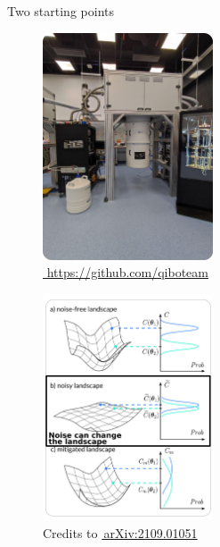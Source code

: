 \documentclass[8pt, xcolor={svgnames}, hyperref={linkcolor=black}]{beamer}
\begin{document}
\begin{frame}{Two starting points}
\begin{multicols}{2}
\begin{figure}
\includegraphics[width=0.45\textwidth, height=0.8\textheight]{figures/tii_lab.png}
\caption*{\href{https://github.com/qiboteam}{\faGithub\,\,https://github.com/qiboteam}}
\end{figure}
\begin{figure}
\includegraphics[width=0.45\textwidth, height=0.8\textheight]{figures/NIBP_2.png}
\caption*{Credits to \href{https://arxiv.org/abs/2109.01051}{\faBook\,arXiv:2109.01051}}
\end{figure}
\end{multicols}
\end{frame}
\end{document}
